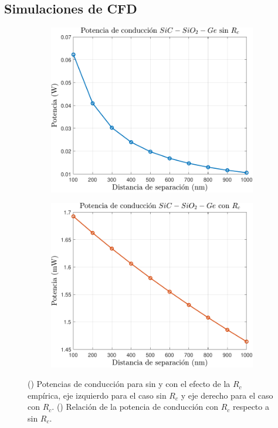 \subsection{Simulaciones de CFD}
\graphicspath{ {./figuras/Resultados/conduccion/pdf/} }
\begin{figure}[H]
	\centering
	\begin{subfigure}[b]{0.49\textwidth}
		\centering
			\includegraphics[width=1.00\textwidth]{Pn_SiCSiO2Ge.pdf}
		\caption{ }
		\label{fig:Prc_SiCSiO2Ge}
	\end{subfigure}
	\hfill
	\begin{subfigure}[b]{0.49\textwidth}
		\centering
			\includegraphics[width=1.00\textwidth]{Prc_SiCSiO2Ge.pdf}
		\caption{ }
		\label{fig:relPrc_SiCSiO2Ge}
	\end{subfigure}
	\caption{() Potencias de conducción para sin y con el efecto de la $R_c$ empírica, eje izquierdo para el caso sin $R_c$ y eje derecho para el caso con $R_c$. () Relación de la potencia de conducción con $R_c$ respecto a sin $R_c$.}
	\label{fig:PrcCond_SiCSiO2Ge}
\end{figure}
